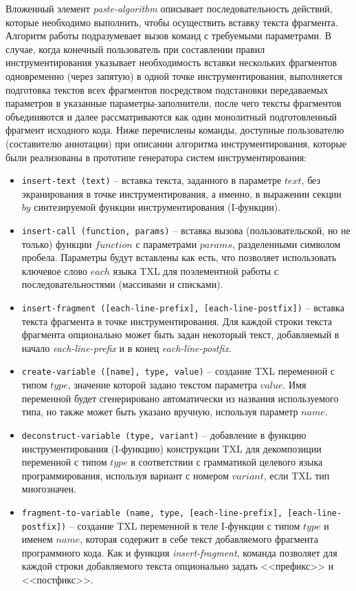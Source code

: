 Вложенный элемент \textit{paste-algorithm} описывает последовательность действий, которые необходимо выполнить, чтобы осуществить вставку текста фрагмента.
Алгоритм работы подразумевает вызов команд с требуемыми параметрами.
В случае, когда конечный пользователь при составлении правил инструментирования указывает необходимость вставки нескольких фрагментов одновременно (через запятую) в одной точке инструментирования, выполняется подготовка текстов всех фрагментов посредством подстановки передаваемых параметров в указанные параметры-заполнители, после чего тексты фрагментов объединяются и далее рассматриваются как один монолитный подготовленный фрагмент исходного кода.
Ниже перечислены команды, доступные пользователю (составителю аннотации) при описании алгоритма инструментирования, которые были реализованы в прототипе генератора систем инструментирования:

\begin{itemize}[noitemsep]
  \item \lstinline{insert-text (text)} --
  вставка текста, заданного в параметре $text$, без экранирования в точке инструментирования, а именно, в выражении секции $by$ синтезируемой функции инструментирования (I-функции).

  \item \lstinline{insert-call (function, params)} --
  вставка вызова (пользовательской, но не только) функции $function$ с параметрами $params$, разделенными символом пробела. Параметры будут вставлены как есть, что позволяет использовать ключевое слово $each$ языка TXL для поэлементной работы с последовательностями (массивами и списками).

  \item \lstinline{insert-fragment ([each-line-prefix], [each-line-postfix])} --
  вставка текста фрагмента в точке инструментирования. Для каждой строки текста фрагмента опционально может быть задан некоторый текст, добавляемый в начало \textit{each-line-prefix} и в конец \textit{each-line-postfix}.

  \item \lstinline{create-variable ([name], type, value)} --
  создание TXL переменной с типом $type$, значение которой задано текстом параметра $value$. Имя переменной будет сгенерировано автоматически из названия используемого типа, но также может быть указано вручную, используя параметр $name$.

  \item \lstinline{deconstruct-variable (type, variant)} --
  добавление в функцию инструментирования (I-функцию) конструкции TXL для декомпозиции переменной с типом $type$ в соответствии с грамматикой целевого языка программирования, используя вариант с номером $variant$, если TXL тип многозначен.

  \item \lstinline{fragment-to-variable (name, type, [each-line-prefix], [each-line-postfix])} --
  создание TXL переменной в теле I-функции с типом $type$ и именем $name$, которая содержит в себе текст добавляемого фрагмента программного кода. Как и функция \textit{insert-fragment}, команда позволяет для каждой строки добавляемого текста опционально задать <<префикс>> и <<постфикс>>.
\end{itemize}

